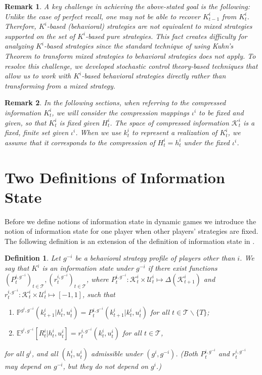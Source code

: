 \documentclass[pdflatex,sn-basic]{sn-jnl}
\newcommand{\E}{\mathbb{E}}
\renewcommand{\Pr}{\mathbb{P}}
\newcommand{\Comp}{K}
\newcommand{\comp}{k}
\newcommand{\Compset}{\mathcal{K}}
\theoremstyle{thmstyleone}%
\theoremstyle{thmstyletwo}%
\newtheorem{remark}{Remark}
\theoremstyle{thmstylethree}%
\newtheorem{defn}{Definition}
\begin{document}
\begin{remark}
{A key challenge in achieving the above-stated goal is the following: Unlike the case of perfect recall,} one may not be able to recover $\Comp_{t-1}^i$ from $\Comp_t^i$. 
Therefore, $\Comp^i$-based (behavioral) strategies are not equivalent to mixed strategies supported on the set of $\Comp^i$-based pure strategies. This fact creates difficulty for analyzing $\Comp^i$-based strategies since the standard technique of using Kuhn's Theorem \citep{kuhn2016extensive} to transform mixed strategies to behavioral strategies does not apply. To resolve this challenge, we developed stochastic control theory-based techniques that allow us to work with $\Comp^i$-based behavioral strategies directly rather than transforming from a mixed strategy. 
\end{remark}

\begin{remark}
    In the following sections, when referring to the compressed information $\Comp_t^i$, we will consider the compression mappings $\iota^i$ to be fixed and given, so that $\Comp_t^i$ is fixed given $H_t^i$. The space of compressed information $\Compset_t^i$ is a fixed, finite set given $\iota^i$. When we use $\comp_t^i$ to represent a realization of $\Comp_t^i$, we assume that it corresponds to the compression of $H_t^i=h_t^i$ under the fixed $\iota^i$.
\end{remark}

\section{Two Definitions of Information State}\label{sec:twoinfostates}
Before we define notions of information state in dynamic games we introduce the notion of information state for one player when other players' strategies are fixed. The following definition is an extension of the definition of information state in \cite{subramanian2020approximate}.

\begin{defn}\label{def:infostate}
	Let $g^{-i}$ be a behavioral strategy profile of players other than $i$. We say that $\Comp^i$ is an \emph{information state under $g^{-i}$} if there exist functions $(P_t^{i,g^{-i}})_{t\in\mathcal{T}}, (r_t^{i,g^{-i}})_{t\in\mathcal{T}}$, where $P_t^{i,g^{-i}}\colon\Compset_t^i\times \mathcal{U}_t^i \mapsto \Delta(\Compset_{t+1}^i)$ and $r_t^{i,g^{-i}}\colon\Compset_t^i\times \mathcal{U}_t^i \mapsto [-1, 1]$, such that
	\begin{enumerate}[(1)]
		\item $\Pr^{g^i, g^{-i}}(\comp_{t+1}^i|h_t^i, u_t^i) = P_t^{i,g^{-i}}(\comp_{t+1}^i|\comp_t^i, u_t^i)$ for all $t\in\mathcal{T}\backslash\{T\}$;
		\item $\E^{g^i, g^{-i}}[R_t^i|h_t^i, u_t^i] = r_t^{i,g^{-i}}(\comp_t^i, u_t^i)$ for all $t\in \mathcal{T}$,
	\end{enumerate}
	for all $g^i$, and all $(h_t^i, u_t^i)$ admissible under $(g^i, g^{-i})$. (Both $P_t^{i,g^{-i}}$ and $r_t^{i,g^{-i}}$ may depend on $g^{-i}$, but they do not depend on $g^i$.)
\end{defn}
\end{document}
